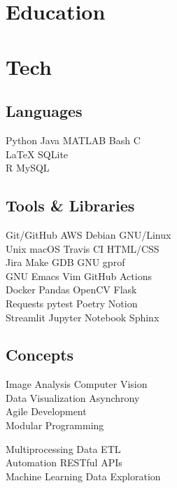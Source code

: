 \documentclass[]{jidicula-resume}
\begin{document}
\section{Education}
\sectionsep

\section{Tech}
\begin{minipage}[t]{.32\textwidth}
  \subsection{Languages}
  Python \textbullet{} Java \textbullet{} MATLAB \textbullet{} Bash \textbullet{} C \\
  \LaTeX{} \textbullet{} SQLite \\
  R \textbullet{} MySQL
  \sectionsep
\end{minipage}
\hfill
\begin{minipage}[t]{.32\textwidth}
  \subsection{Tools \& Libraries}
  Git/GitHub \textbullet{} AWS \textbullet{} {Debian GNU/Linux} \\
  Unix \textbullet{} macOS \textbullet{} Travis CI \textbullet{} HTML/CSS \\
  Jira \textbullet{} Make \textbullet{} GDB \textbullet{} GNU gprof \\
  GNU Emacs \textbullet{} Vim \textbullet{} GitHub Actions \\
  Docker \textbullet{} Pandas \textbullet{} OpenCV \textbullet{} Flask \\
  Requests \textbullet{} pytest \textbullet{} Poetry \textbullet{} Notion \\
  Streamlit \textbullet{} Jupyter Notebook \textbullet{} Sphinx
  \sectionsep
\end{minipage}
\hfill
\begin{minipage}[t]{.32\textwidth}
  \subsection{Concepts}
  Image Analysis \textbullet{} Computer Vision \\
  Data Visualization \textbullet{} Asynchrony \\
  Agile Development \\
  Modular Programming
  
  Multiprocessing \textbullet{} Data ETL \\
  Automation \textbullet{}  RESTful APIs \\
  Machine Learning \textbullet{} Data Exploration
  \sectionsep
\end{minipage}
\end{document}
